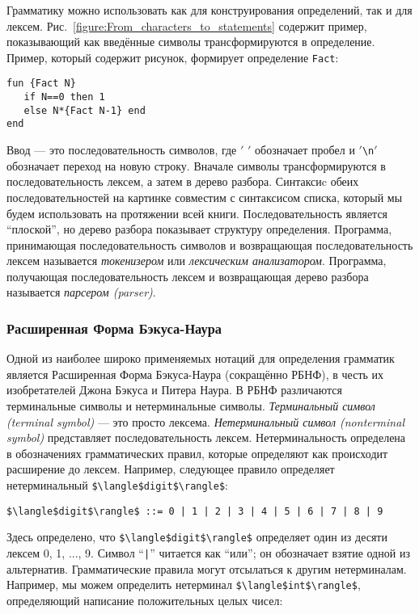 Грамматику можно использовать как для конструирования определений, так и для лексем. Рис.~\ref{figure:From_characters_to_statements} содержит пример, показывающий как введённые символы трансформируются в определение. Пример, который содержит рисунок, формирует определение \lstinline|Fact|:

\begin{lstlisting}
fun {Fact N}
   if N==0 then 1
   else N*{Fact N-1} end
end
\end{lstlisting}

Ввод --- это последовательность символов, где $'$ $'$ обозначает пробел и $'$\lstinline|\n|$'$ обозначает переход на новую строку. Вначале символы трансформируются в последовательность лексем, а затем в дерево разбора. Синтаксиc обеих последовательностей на картинке совместим с синтаксисом списка, который мы будем использовать на протяжении всей книги. Последовательность является ``плоской'', но дерево разбора показывает структуру определения. Программа, принимающая последовательность символов и возвращающая последовательность лексем называется \emph{токенизером} или \emph{лексическим анализатором}. Программа, получающая последовательность лексем и возвращающая дерево разбора называется \emph{парсером (parser)}.

\subsubsection{Расширенная Форма Бэкуса-Наура}

Одной из наиболее широко применяемых нотаций для определения грамматик является Расширенная Форма Бэкуса-Наура (сокращённо РБНФ), в честь их изобретателей Джона Бэкуса и Питера Наура. В РБНФ различаются терминальные символы и нетерминальные символы. \emph{Терминальный символ (terminal symbol)} --- это просто лексема. \emph{Нетерминальный символ (nonterminal symbol)} представляет последовательность лексем. Нетерминальность определена в обозначениях грамматических правил, которые определяют как происходит расширение до лексем. Например, следующее правило определяет нетерминальный \lstinline|$\langle$digit$\rangle$|:

\begin{lstlisting}
$\langle$digit$\rangle$ ::= 0 | 1 | 2 | 3 | 4 | 5 | 6 | 7 | 8 | 9
\end{lstlisting}

Здесь определено, что \lstinline|$\langle$digit$\rangle$| определяет один из десяти лексем 0, 1, ..., 9. Символ ``\lstinline!|!'' читается как ``или''; он обозначает взятие одной из альтернатив. Грамматические правила могут отсылаться к другим нетерминалам. Например, мы можем определить нетерминал \lstinline|$\langle$int$\rangle$|, определяющий написание положительных целых чисел:

